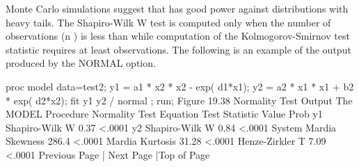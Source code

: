  		 	 
Monte Carlo simulations suggest that  has good power against distributions with heavy tails.
The Shapiro-Wilk W test is computed only when the number of observations (n ) is less than  while computation of the Kolmogorov-Smirnov test statistic requires at least  observations.
The following is an example of the output produced by the NORMAL option.

proc model data=test2;
   y1 = a1 * x2 * x2 - exp( d1*x1);
   y2 = a2 * x1 * x1 + b2 * exp( d2*x2);
   fit y1 y2 / normal ;
run;
Figure 19.38 Normality Test Output
The MODEL Procedure
Normality Test
Equation	Test Statistic	Value	Prob
y1	Shapiro-Wilk W	0.37	<.0001
y2	Shapiro-Wilk W	0.84	<.0001
System	Mardia Skewness	286.4	<.0001
 	Mardia Kurtosis	31.28	<.0001
 	Henze-Zirkler T	7.09	<.0001
Previous Page | Next Page |Top of Page

